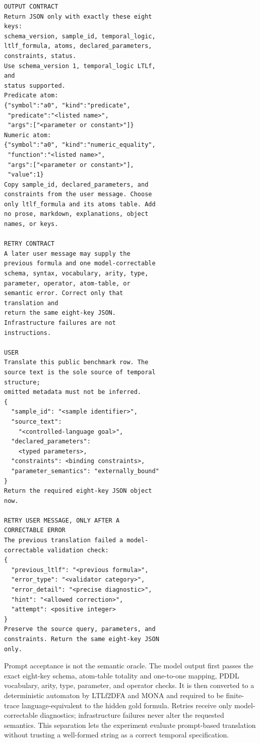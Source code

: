 \begin{verbatim}
OUTPUT CONTRACT
Return JSON only with exactly these eight
keys:
schema_version, sample_id, temporal_logic,
ltlf_formula, atoms, declared_parameters,
constraints, status.
Use schema_version 1, temporal_logic LTLf,
and
status supported.
Predicate atom:
{"symbol":"a0", "kind":"predicate",
 "predicate":"<listed name>",
 "args":["<parameter or constant>"]}
Numeric atom:
{"symbol":"a0", "kind":"numeric_equality",
 "function":"<listed name>",
 "args":["<parameter or constant>"],
 "value":1}
Copy sample_id, declared_parameters, and
constraints from the user message. Choose
only ltlf_formula and its atoms table. Add
no prose, markdown, explanations, object
names, or keys.

RETRY CONTRACT
A later user message may supply the
previous formula and one model-correctable
schema, syntax, vocabulary, arity, type,
parameter, operator, atom-table, or
semantic error. Correct only that
translation and
return the same eight-key JSON.
Infrastructure failures are not
instructions.

USER
Translate this public benchmark row. The
source text is the sole source of temporal
structure;
omitted metadata must not be inferred.
{
  "sample_id": "<sample identifier>",
  "source_text":
    "<controlled-language goal>",
  "declared_parameters":
    <typed parameters>,
  "constraints": <binding constraints>,
  "parameter_semantics": "externally_bound"
}
Return the required eight-key JSON object
now.

RETRY USER MESSAGE, ONLY AFTER A
CORRECTABLE ERROR
The previous translation failed a model-
correctable validation check:
{
  "previous_ltlf": "<previous formula>",
  "error_type": "<validator category>",
  "error_detail": "<precise diagnostic>",
  "hint": "<allowed correction>",
  "attempt": <positive integer>
}
Preserve the source query, parameters, and
constraints. Return the same eight-key JSON
only.
\end{verbatim}
\endgroup

Prompt acceptance is not the semantic oracle. The model output first passes
the exact eight-key schema, atom-table totality and one-to-one mapping, PDDL
vocabulary, arity, type,
parameter, and operator checks. It is then converted to a deterministic
automaton by LTLf2DFA and MONA and required to be finite-trace
language-equivalent to the hidden gold formula. Retries receive only
model-correctable diagnostics;
infrastructure failures never alter the requested semantics. This separation
lets the experiment evaluate prompt-based translation without trusting a
well-formed string as a correct temporal specification.

